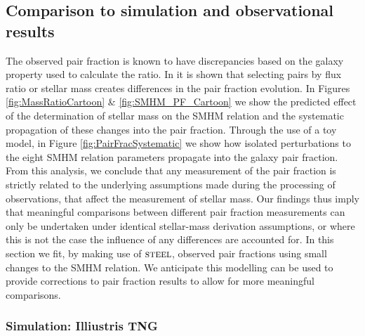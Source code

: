 \subsection{Comparison to simulation and observational results}
\label{subsec:SimObsRes}
The observed pair fraction is known to have discrepancies based on the galaxy property used to calculate the ratio. In \citet{Man2016RESOLVING03} it is shown that selecting pairs by flux ratio or stellar mass creates differences in the pair fraction evolution. 
In Figures \ref{fig:MassRatioCartoon} \& \ref{fig:SMHM_PF_Cartoon} we show the predicted effect of the determination of stellar mass on the SMHM relation and the systematic propagation of these changes into the pair fraction. 
Through the use of a toy model, in Figure \ref{fig:PairFracSystematic} we show how isolated perturbations to the eight SMHM relation parameters propagate into the galaxy pair fraction.
From this analysis, we conclude that any measurement of the pair fraction is strictly related to the underlying assumptions made during the processing of observations, that affect the measurement of stellar mass. 
Our findings thus imply that meaningful comparisons between different pair fraction measurements can only be undertaken under identical stellar-mass derivation assumptions, or where this is not the case the influence of any differences are accounted for.
In this section we fit, by making use of $\textsc{steel}$, observed pair fractions using small changes to the SMHM relation.
We anticipate this modelling can be used to provide corrections to pair fraction results to allow for more meaningful comparisons.

\subsubsection{Simulation: Illiustris TNG}

